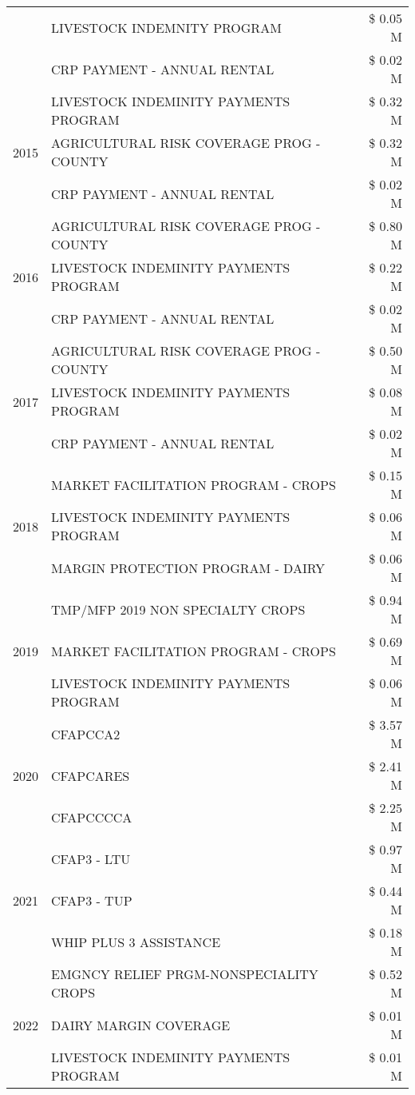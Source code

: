 \begin{tabular}{llr}
 & LIVESTOCK INDEMNITY PROGRAM & \$ 0.05 M \\
 & CRP PAYMENT - ANNUAL RENTAL & \$ 0.02 M \\
\cline{1-3}
\multirow[t]{3}{*}{2015} & LIVESTOCK INDEMINITY PAYMENTS PROGRAM & \$ 0.32 M \\
 & AGRICULTURAL RISK COVERAGE PROG - COUNTY & \$ 0.32 M \\
 & CRP PAYMENT - ANNUAL RENTAL & \$ 0.02 M \\
\cline{1-3}
\multirow[t]{3}{*}{2016} & AGRICULTURAL RISK COVERAGE PROG - COUNTY & \$ 0.80 M \\
 & LIVESTOCK INDEMINITY PAYMENTS PROGRAM & \$ 0.22 M \\
 & CRP PAYMENT - ANNUAL RENTAL & \$ 0.02 M \\
\cline{1-3}
\multirow[t]{3}{*}{2017} & AGRICULTURAL RISK COVERAGE PROG - COUNTY & \$ 0.50 M \\
 & LIVESTOCK INDEMINITY PAYMENTS PROGRAM & \$ 0.08 M \\
 & CRP PAYMENT - ANNUAL RENTAL & \$ 0.02 M \\
\cline{1-3}
\multirow[t]{3}{*}{2018} & MARKET FACILITATION PROGRAM - CROPS & \$ 0.15 M \\
 & LIVESTOCK INDEMINITY PAYMENTS PROGRAM & \$ 0.06 M \\
 & MARGIN PROTECTION PROGRAM - DAIRY & \$ 0.06 M \\
\cline{1-3}
\multirow[t]{3}{*}{2019} & TMP/MFP 2019 NON SPECIALTY CROPS & \$ 0.94 M \\
 & MARKET FACILITATION PROGRAM - CROPS & \$ 0.69 M \\
 & LIVESTOCK INDEMINITY PAYMENTS PROGRAM & \$ 0.06 M \\
\cline{1-3}
\multirow[t]{3}{*}{2020} & CFAPCCA2 & \$ 3.57 M \\
 & CFAPCARES & \$ 2.41 M \\
 & CFAPCCCCA & \$ 2.25 M \\
\cline{1-3}
\multirow[t]{3}{*}{2021} & CFAP3 - LTU & \$ 0.97 M \\
 & CFAP3 - TUP & \$ 0.44 M \\
 & WHIP PLUS 3 ASSISTANCE & \$ 0.18 M \\
\cline{1-3}
\multirow[t]{3}{*}{2022} & EMGNCY RELIEF PRGM-NONSPECIALITY CROPS & \$ 0.52 M \\
 & DAIRY MARGIN COVERAGE & \$ 0.01 M \\
 & LIVESTOCK INDEMINITY PAYMENTS PROGRAM & \$ 0.01 M \\
\cline{1-3}
\bottomrule
\end{tabular}
